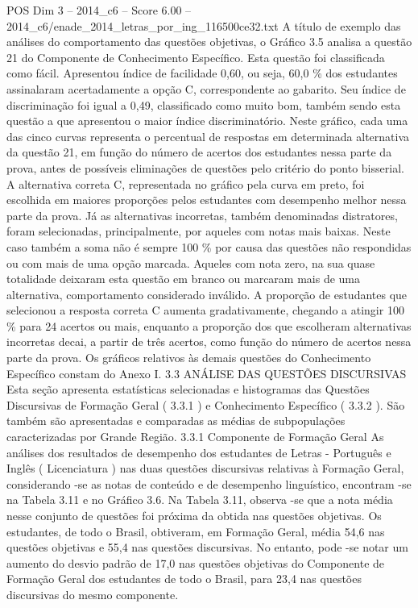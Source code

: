 \begin{textsample}{POS Dim 3 – 2014\_c6 – Score 6.00 – 2014\_c6/enade\_2014\_letras\_por\_ing\_116500ce32.txt}
A título de exemplo das análises do comportamento das questões objetivas, o Gráfico 3.5 analisa a questão 21 do Componente de Conhecimento Específico.
Esta questão foi classificada como fácil.
Apresentou índice de facilidade 0,60, ou seja, 60,0 \% dos estudantes assinalaram acertadamente a opção C, correspondente ao gabarito.
Seu índice de discriminação foi igual a 0,49, classificado como muito bom, também sendo esta questão a que apresentou o maior índice discriminatório.
Neste gráfico, cada uma das cinco curvas representa o percentual de respostas em determinada alternativa da questão 21, em função do número de acertos dos estudantes nessa parte da prova, antes de possíveis eliminações de questões pelo critério do ponto bisserial.
A alternativa correta C, representada no gráfico pela curva em preto, foi escolhida em maiores proporções pelos estudantes com desempenho melhor nessa parte da prova.
Já as alternativas incorretas, também denominadas distratores, foram selecionadas, principalmente, por aqueles com notas mais baixas.
Neste caso também a soma não é sempre 100 \% por causa das questões não respondidas ou com mais de uma opção marcada.
Aqueles com nota zero, na sua quase totalidade deixaram esta questão em branco ou marcaram mais de uma alternativa, comportamento considerado inválido.
A proporção de estudantes que selecionou a resposta correta C aumenta gradativamente, chegando a atingir 100 \% para 24 acertos ou mais, enquanto a proporção dos que escolheram alternativas incorretas decai, a partir de três acertos, como função do número de acertos nessa parte da prova.
Os gráficos relativos às demais questões do Conhecimento Específico constam do Anexo I. 3.3 ANÁLISE DAS QUESTÕES DISCURSIVAS Esta seção apresenta estatísticas selecionadas e histogramas das Questões Discursivas de Formação Geral ( 3.3.1 ) e Conhecimento Específico ( 3.3.2 ).
São também são apresentadas e comparadas as médias de subpopulações caracterizadas por Grande Região. 3.3.1 Componente de Formação Geral As análises dos resultados de desempenho dos estudantes de Letras - Português e Inglês ( Licenciatura ) nas duas questões discursivas relativas à Formação Geral, considerando -se as notas de conteúdo e de desempenho linguístico, encontram -se na Tabela 3.11 e no Gráfico 3.6.
Na Tabela 3.11, observa -se que a nota média nesse conjunto de questões foi próxima da obtida nas questões objetivas.
Os estudantes, de todo o Brasil, obtiveram, em Formação Geral, média 54,6 nas questões objetivas e 55,4 nas questões discursivas.
No entanto, pode -se notar um aumento do desvio padrão de 17,0 nas questões objetivas do Componente de Formação Geral dos estudantes de todo o Brasil, para 23,4 nas questões discursivas do mesmo componente.

\end{textsample}
